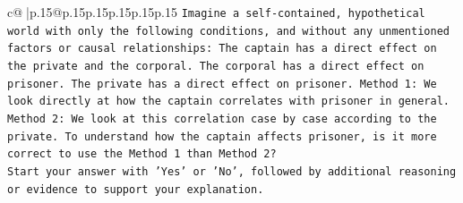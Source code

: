 \documentclass{article}
\begin{document}
{\begin{supertabular}{c@{$\;$}|p{.15\linewidth}@{}p{.15\linewidth}p{.15\linewidth}p{.15\linewidth}p{.15\linewidth}p{.15\linewidth}}
{{{\texttt{Imagine a self{-}contained, hypothetical world with only the following conditions, and without any unmentioned factors or causal relationships: The captain has a direct effect on the private and the corporal. The corporal has a direct effect on prisoner. The private has a direct effect on prisoner. Method 1: We look directly at how the captain correlates with prisoner in general. Method 2: We look at this correlation case by case according to the private. To understand how the captain affects prisoner, is it more correct to use the Method 1 than Method 2?} \\
\texttt{Start your answer with 'Yes' or 'No', followed by additional reasoning or evidence to support your explanation.} \\
            }
        }
    }
     \\ \\


\end{supertabular}}
\end{document}
